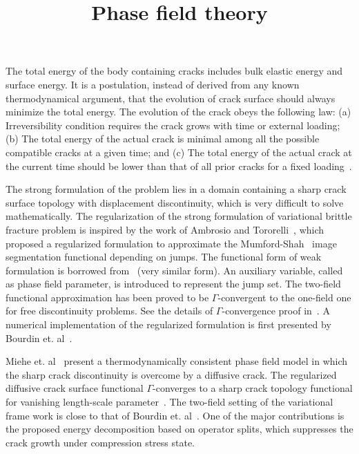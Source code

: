 \documentclass[10pt,onecolumn]{article}
\title{Phase field theory}
\author{}
\date{}
\begin{document}
\maketitle

{}



The total energy of the body containing cracks includes bulk elastic energy and surface energy. It is a postulation, instead of derived from any known thermodynamical argument, that the evolution of crack surface should always minimize the total energy. The evolution of the crack obeys the following law: (a) Irreversibility condition requires the crack grows with time or external loading; (b) The total energy of the actual crack is minimal among all the possible compatible cracks at a given time; and (c) The total energy of the actual crack at the current time should be lower than that of all prior cracks for a fixed loading~\cite{francfort1998revisiting}. 

The strong formulation of the problem lies in a domain containing a sharp crack surface topology with displacement discontinuity, which is very difficult to solve mathematically. The regularization of the strong formulation of variational brittle fracture problem is inspired by the work of Ambrosio and Tororelli~\cite{ambrosio1990approximation}, which proposed a regularized formulation to approximate the Mumford-Shah~\cite{mumford1989optimal} image segmentation functional depending on jumps. The functional form of weak formulation is borrowed from~\cite{ambrosio1990approximation} (very similar form). An auxiliary variable, called as phase field parameter, is introduced to represent the jump set. The two-field functional approximation has been proved to be $\Gamma$-convergent to the one-field one for free discontinuity problems. See the details of $\Gamma$-convergence proof in~\cite{ambrosio1990approximation}. A numerical implementation of the regularized formulation is first presented by Bourdin et. al~\cite{bourdin2000numerical}.

Miehe et. al~\cite{miehe2010, miehe2010phase} present a thermodynamically consistent phase field model in which the sharp crack discontinuity is overcome by a diffusive crack. The regularized diffusive crack surface functional $\Gamma$-converges to a sharp crack topology functional for vanishing length-scale parameter~\cite{braides1998approximation}. The two-field setting of the variational frame work is close to that of Bourdin et. al~\cite{bourdin2000numerical,bourdin2008variational}. One of the major contributions is the proposed energy decomposition based on operator splits, which suppresses the crack growth under compression stress state.
\end{document}
